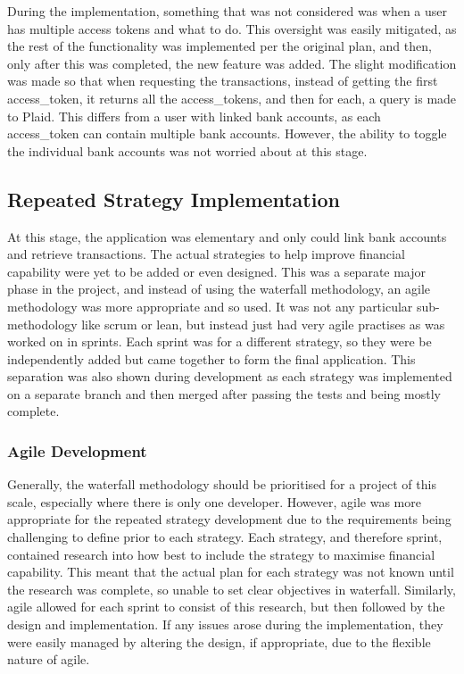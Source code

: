 During the implementation, something that was not considered was when a user has multiple access tokens and what to do. This oversight was easily mitigated, as the rest of the functionality was implemented per the original plan, and then, only after this was completed, the new feature was added. The slight modification was made so that when requesting the transactions, instead of getting the first access\_token, it returns all the access\_tokens, and then for each, a query is made to Plaid. This differs from a user with linked bank accounts, as each access\_token can contain multiple bank accounts. However, the ability to toggle the individual bank accounts was not worried about at this stage.

\subsection{Repeated Strategy Implementation}
At this stage, the application was elementary and only could link bank accounts and retrieve transactions. The actual strategies to help improve financial capability were yet to be added or even designed. This was a separate major phase in the project, and instead of using the waterfall methodology, an agile methodology was more appropriate and so used. It was not any particular sub-methodology like scrum or lean, but instead just had very agile practises as was worked on in sprints. Each sprint was for a different strategy, so they were be independently added but came together to form the final application. This separation was also shown during development as each strategy was implemented on a separate branch and then merged after passing the tests and being mostly complete.


\subsubsection{Agile Development}
Generally, the waterfall methodology should be prioritised for a project of this scale, especially where there is only one developer. However, agile was more appropriate for the repeated strategy development due to the requirements being challenging to define prior to each strategy. Each strategy, and therefore sprint, contained research into how best to include the strategy to maximise financial capability. This meant that the actual plan for each strategy was not known until the research was complete, so unable to set clear objectives in waterfall. Similarly, agile allowed for each sprint to consist of this research, but then followed by the design and implementation. If any issues arose during the implementation, they were easily managed by altering the design, if appropriate, due to the flexible nature of agile.


